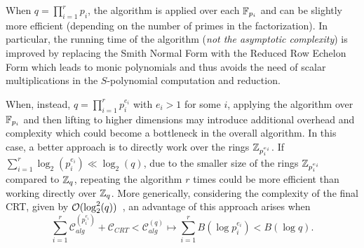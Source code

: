 When $q = \prod_{i=1}^r p_i$, the algorithm is applied over each \(\mathbb{F}_{p_i}\) and can be slightly more efficient (depending on the number of primes in the factorization). In particular, the running time of the algorithm (\emph{not the asymptotic complexity}) is improved by replacing the Smith Normal Form with the Reduced Row Echelon Form which leads to monic polynomials and thus avoids the need of scalar multiplications in the $S$-polynomial computation and reduction. 

When, instead, $q = \prod_{i=1}^r p_i^{e_i}$ with $e_i > 1$ for some $i$, applying the algorithm over \(\mathbb{F}_{p_i}\) and then lifting to higher dimensions may introduce additional overhead and complexity which could become a bottleneck in the overall algorithm. In this case, a better approach is to directly work over the rings \(\mathbb{Z}_{p_i^{e_i}}\). If \(\sum_{i=1}^r \log_2(p_i^{e_i}) \ll \log_2(q)\), due to the smaller size of the rings \(\mathbb{Z}_{p_i^{e_i}}\) compared to \(\mathbb{Z}_q\), repeating the algorithm $r$ times could be more efficient than working directly over \(\mathbb{Z}_q\).
More generically, considering the complexity of the final CRT, given by \(\mathcal{O}(\log_2^2(q))\)~\cite{DBLP:books/daglib/0018101}, an advantage of this approach arises when 
\begin{equation*}\sum_{i=1}^r \mathscr{C}^{(p_i^{e_i})}_{alg} + \mathscr{C}_{CRT} < \mathscr{C}^{(q)}_{alg} \mapsto
    \sum_{i=1}^r B(\log p_i^{e_i})  < B(\log q).
\end{equation*}